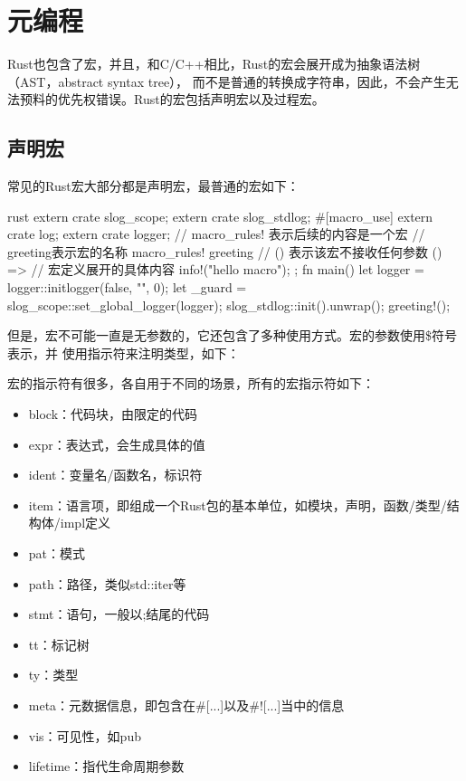 \section{元编程}
Rust也包含了宏，并且，和C/C++相比，Rust的宏会展开成为抽象语法树（AST，abstract syntax tree），
而不是普通的转换成字符串，因此，不会产生无法预料的优先权错误。Rust的宏包括声明宏以及过程宏。
\subsection{声明宏}
常见的Rust宏大部分都是声明宏，最普通的宏如下：
\begin{code-block}{rust}
extern crate slog_scope;
extern crate slog_stdlog;
#[macro_use]
extern crate log;
extern crate logger;
// macro_rules! 表示后续的内容是一个宏
// greeting表示宏的名称
macro_rules! greeting {
    // () 表示该宏不接收任何参数
    () => {
        // 宏定义展开的具体内容
        info!("hello macro");
    };
}
fn main() {
    let logger = logger::initlogger(false, "", 0);
    let _guard = slog_scope::set_global_logger(logger);
    slog_stdlog::init().unwrap();
    greeting!();
}
\end{code-block}
但是，宏不可能一直是无参数的，它还包含了多种使用方式。宏的参数使用\$符号表示，并
使用指示符来注明类型，如下：
宏的指示符有很多，各自用于不同的场景，所有的宏指示符如下：
\begin{itemize}
  \item block：代码块，由{}限定的代码
  \item expr：表达式，会生成具体的值
  \item ident：变量名/函数名，标识符
  \item item：语言项，即组成一个Rust包的基本单位，如模块，声明，函数/类型/结构体/impl定义
  \item pat：模式
  \item path：路径，类似std::iter等
  \item stmt：语句，一般以;结尾的代码
  \item tt：标记树
  \item ty：类型
  \item meta：元数据信息，即包含在\#[...]以及\#![...]当中的信息
  \item vis：可见性，如pub
  \item lifetime：指代生命周期参数
\end{itemize}

